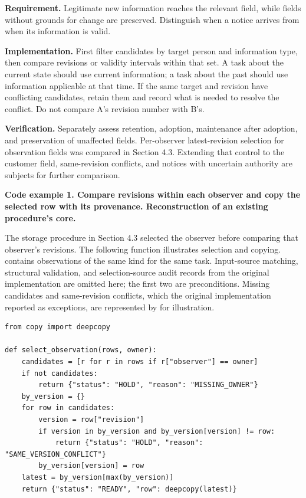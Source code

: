 \documentclass[10pt,a4paper]{article}
\begin{document}
\textbf{Requirement.} Legitimate new information reaches the relevant field, while fields without grounds for change are preserved. Distinguish when a notice arrives from when its information is valid.

\textbf{Implementation.} First filter candidates by target person and information type, then compare revisions or validity intervals within that set. A task about the current state should use current information; a task about the past should use information applicable at that time. If the same target and revision have conflicting candidates, retain them and record what is needed to resolve the conflict. Do not compare A's revision number with B's.

\textbf{Verification.} Separately assess retention, adoption, maintenance after adoption, and preservation of unaffected fields. Per-observer latest-revision selection for observation fields was compared in Section 4.3. Extending that control to the customer field, same-revision conflicts, and notices with uncertain authority are subjects for further comparison.

\textbf{Code example 1. Compare revisions within each observer and copy the selected row with its provenance. Reconstruction of an existing procedure's core.}

The storage procedure in Section 4.3 selected the observer before comparing that observer's revisions. The following function illustrates selection and copying. \texttt{} contains observations of the same kind for the same task. Input-source matching, structural validation, and selection-source audit records from the original implementation are omitted here; the first two are preconditions. Missing candidates and same-revision conflicts, which the original implementation reported as exceptions, are represented by \texttt{} for illustration.

\noindent\begin{minipage}{\linewidth}
\begin{verbatim}
from copy import deepcopy

def select_observation(rows, owner):
    candidates = [r for r in rows if r["observer"] == owner]
    if not candidates:
        return {"status": "HOLD", "reason": "MISSING_OWNER"}
    by_version = {}
    for row in candidates:
        version = row["revision"]
        if version in by_version and by_version[version] != row:
            return {"status": "HOLD", "reason": "SAME_VERSION_CONFLICT"}
        by_version[version] = row
    latest = by_version[max(by_version)]
    return {"status": "READY", "row": deepcopy(latest)}
\end{verbatim}
\end{minipage}\par
\end{document}
